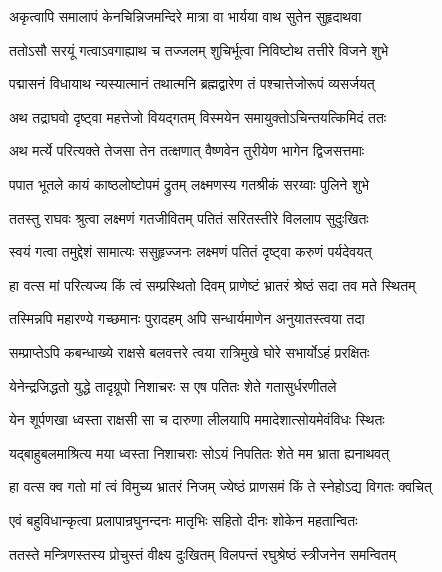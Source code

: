 \twolineshloka
{अकृत्वापि समालापं केनचिन्निजमन्दिरे}
{मात्रा वा भार्यया वाथ सुतेन सुहृदाथवा}%

\twolineshloka
{ततोऽसौ सरयूं गत्वाऽवगाह्याथ च तज्जलम्}
{शुचिर्भूत्वा निविष्टोथ तत्तीरे विजने शुभे}%

\twolineshloka
{पद्मासनं विधायाथ न्यस्यात्मानं तथात्मनि}
{ब्रह्मद्वारेण तं पश्चात्तेजोरूपं व्यसर्जयत्}%

\twolineshloka
{अथ तद्राघवो दृष्ट्वा महत्तेजो वियद्गतम्}
{विस्मयेन समायुक्तोऽचिन्तयत्किमिदं ततः}%

\twolineshloka
{अथ मर्त्ये परित्यक्ते तेजसा तेन तत्क्षणात्}
{वैष्णवेन तुरीयेण भागेन द्विजसत्तमाः}%

\twolineshloka
{पपात भूतले कायं काष्ठलोष्टोपमं द्रुतम्}
{लक्ष्मणस्य गतश्रीकं सरय्वाः पुलिने शुभे}%

\twolineshloka
{ततस्तु राघवः श्रुत्वा लक्ष्मणं गतजीवितम्}
{पतितं सरितस्तीरे विललाप सुदुःखितः}%

\twolineshloka
{स्वयं गत्वा तमुद्देशं सामात्यः ससुहृज्जनः}
{लक्ष्मणं पतितं दृष्ट्वा करुणं पर्यदेवयत्}%

\twolineshloka
{हा वत्स मां परित्यज्य किं त्वं सम्प्रस्थितो दिवम्}
{प्राणेष्टं भ्रातरं श्रेष्ठं सदा तव मते स्थितम्}%

\twolineshloka
{तस्मिन्नपि महारण्ये गच्छमानः पुरादहम्}
{अपि सन्धार्यमाणेन अनुयातस्त्वया तदा}%

\twolineshloka
{सम्प्राप्तेऽपि कबन्धाख्ये राक्षसे बलवत्तरे}
{त्वया रात्रिमुखे घोरे सभार्योऽहं प्ररक्षितः}%

\twolineshloka
{येनेन्द्रजिद्धतो युद्धे तादृग्रूपो निशाचरः}
{स एष पतितः शेते गतासुर्धरणीतले}%

\twolineshloka
{येन शूर्पणखा ध्वस्ता राक्षसी सा च दारुणा}
{लीलयापि ममादेशात्सोयमेवंविधः स्थितः}%

\twolineshloka
{यद्बाहुबलमाश्रित्य मया ध्वस्ता निशाचराः}
{सोऽयं निपतितः शेते मम भ्राता ह्यनाथवत्}%

\twolineshloka
{हा वत्स क्व गतो मां त्वं विमुच्य भ्रातरं निजम्}
{ज्येष्ठं प्राणसमं किं ते स्नेहोऽद्य विगतः क्वचित्}%


\twolineshloka
{एवं बहुविधान्कृत्वा प्रलापान्रघुनन्दनः}
{मातृभिः सहितो दीनः शोकेन महतान्वितः}%

\twolineshloka
{ततस्ते मन्त्रिणस्तस्य प्रोचुस्तं वीक्ष्य दुःखितम्}
{विलपन्तं रघुश्रेष्ठं स्त्रीजनेन समन्वितम्}%


